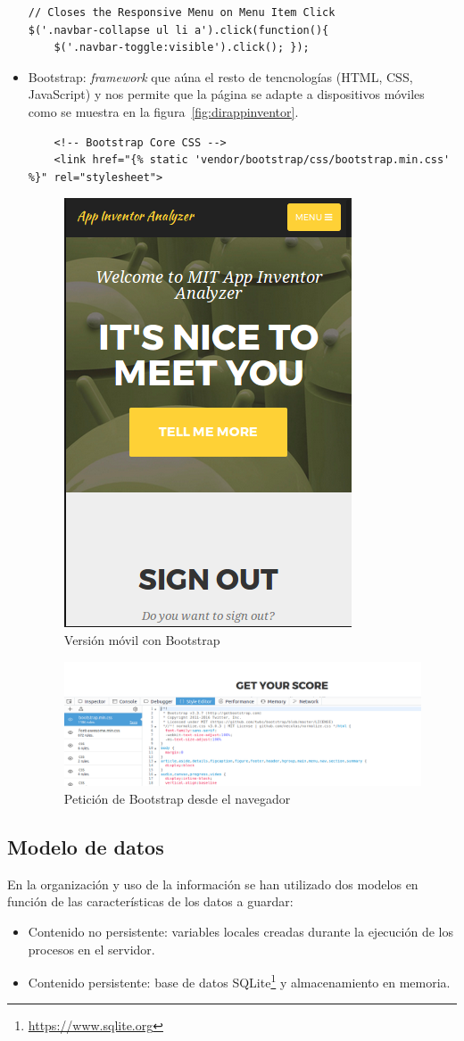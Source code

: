 \documentclass[a4paper, 12pt]{book}
\begin{document}
\begin{itemize}
\begin{lstlisting}[language=HTML]
// Closes the Responsive Menu on Menu Item Click
$('.navbar-collapse ul li a').click(function(){ 
    $('.navbar-toggle:visible').click(); });
	\end{lstlisting}
	\item Bootstrap: \textit{framework} que aúna el resto de tencnologías (HTML, CSS, JavaScript) y nos permite que la página se adapte a dispositivos móviles como se muestra en la figura~\ref{fig:dirappinventor}.
		\begin{lstlisting}
    <!-- Bootstrap Core CSS -->
    <link href="{% static 'vendor/bootstrap/css/bootstrap.min.css' %}" rel="stylesheet">
		\end{lstlisting}
		\begin{figure}[H]
			  \centering
			  \includegraphics[width=0.30\linewidth, keepaspectratio]{img/mobileVersion}
			  \caption{Versión móvil con Bootstrap}
			  \label{fig:mobileVersion}
		\end{figure} 
		\begin{figure}[H]
			  \centering
			  \includegraphics[width=\linewidth, keepaspectratio]{img/bootstrapDebug}
			  \caption{Petición de Bootstrap desde el navegador}
			  \label{fig:mobileVersion}
		\end{figure} 

\end{itemize}                                   

\subsection{Modelo de datos}
En la organización y uso de la información se han utilizado dos modelos en función de las características de los datos a guardar: 
\begin{itemize}
	\item Contenido no persistente: variables locales creadas durante la ejecución de los procesos en el servidor. 
	\item Contenido persistente: base de datos SQLite\footnote{\url{https://www.sqlite.org}} y almacenamiento en memoria.
\end{itemize}                                   
\end{document}
